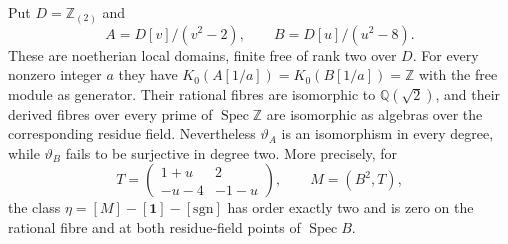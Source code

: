 \begin{proposition}
\label{C:derived_fibre_twins}
Put $D=\mathbb Z_{(2)}$ and
\[
 A=D[v]/(v^2-2),\qquad B=D[u]/(u^2-8).
\]
These are noetherian local domains, finite free of rank two over $D$.
For every nonzero integer $a$ they have
$K_0(A[1/a])=K_0(B[1/a])=\mathbb Z$ with the free module as generator.
Their rational fibres are isomorphic to $\mathbb Q(\sqrt2)$, and their
derived fibres over every prime of $\operatorname{Spec}\mathbb Z$ are
isomorphic as algebras over the corresponding residue field. Nevertheless
$\vartheta_A$ is an isomorphism in every degree, while $\vartheta_B$
fails to be surjective in degree two. More precisely, for
\[
 T=\begin{pmatrix}1+u&2\\-u-4&-1-u\end{pmatrix},\qquad
 M=(B^2,T),
\]
the class $\eta=[M]-[\mathbf1]-[\mathrm{sgn}]$ has order exactly two
and is zero on the rational fibre and at both residue-field points of
$\operatorname{Spec}B$.
\end{proposition}
